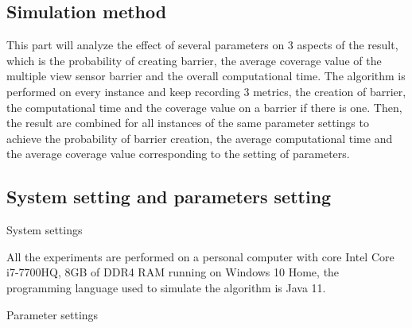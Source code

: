 
\subsection{Simulation method}

This part will analyze the effect of several parameters on 3 aspects of the result, which is the probability of creating barrier, the average coverage value of the multiple view sensor barrier and the overall computational time. The algorithm is performed on every instance and keep recording 3 metrics, the creation of barrier, the computational time and the coverage value on a barrier if there is one. Then, the result are combined for all instances of the same parameter settings to achieve the probability of barrier creation, the average computational time and the average coverage value corresponding to the setting of parameters.

\subsection{System setting and parameters setting}
System settings

All the experiments are performed on a personal computer with core Intel Core i7-7700HQ, 8GB of DDR4 RAM running on Windows 10 Home, the programming language used to simulate the algorithm is Java 11.

Parameter settings

